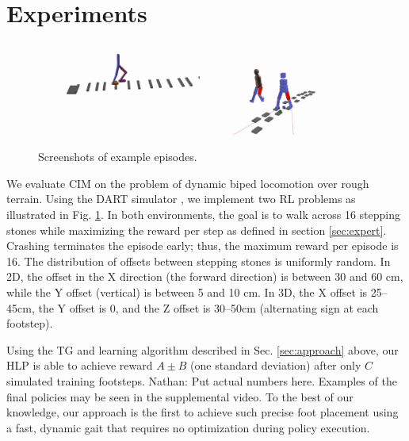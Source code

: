 \documentclass[conference]{IEEEtran}
\newcommand{\nhatch}[1]{{\leavevmode\color{magenta} Nathan: #1}}
\begin{document}

\section{Experiments}

\begin{figure}
  \includegraphics[width=0.48\textwidth]{../figures/2D_ep.png}
  \includegraphics[width=0.48\textwidth]{../figures/3D_ep.png}
  \caption{Screenshots of example episodes.\label{fig:example episodes}}
\end{figure}

We evaluate CIM on the problem of dynamic biped locomotion over rough terrain.
Using the DART simulator \citep{lee2018dart}, we implement two RL problems as illustrated in Fig. \ref{fig:example episodes}.
In both environments, the goal is to walk across 16 stepping stones while maximizing the reward per step as defined in section \ref{sec:expert}.
Crashing terminates the episode early;
thus, the maximum reward per episode is 16.
The distribution of offsets between stepping stones is uniformly random.
In 2D, the offset in the X direction (the forward direction) is between 30 and 60 cm, while the Y offset (vertical) is between 5 and 10 cm.
In 3D, the X offset is 25--45cm, the Y offset is 0, and the Z offset is 30--50cm (alternating sign at each footstep).

Using the TG and learning algorithm described in Sec. \ref{sec:approach} above, our HLP is able to achieve reward $A\pm B$ (one standard deviation) after only $C$ simulated training footsteps.
\nhatch{Put actual numbers here.}
Examples of the final policies may be seen in the supplemental video.
To the best of our knowledge, our approach is the first to achieve such precise foot placement
using a fast, dynamic gait that requires no optimization during policy execution.
\end{document}

